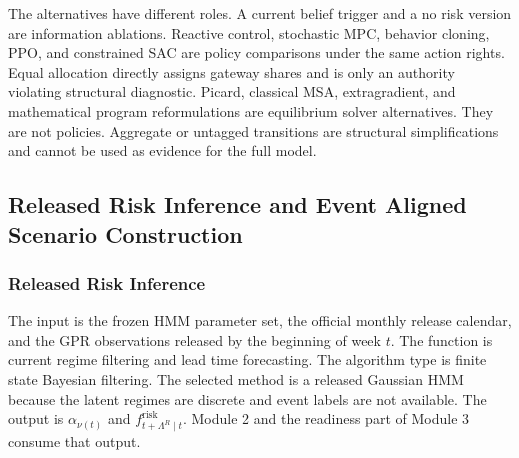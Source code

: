 \documentclass[a4paper,fleqn]{cas-sc}
\begin{document}
The alternatives have different roles. A current belief trigger and a no risk
version are information ablations. Reactive control, stochastic MPC, behavior
cloning, PPO, and constrained SAC are policy comparisons under the same action
rights. Equal allocation directly assigns gateway shares and is only an
authority violating structural diagnostic. Picard, classical MSA,
extragradient, and mathematical program reformulations are equilibrium solver
alternatives. They are not policies. Aggregate or untagged transitions are
structural simplifications and cannot be used as evidence for the full model.

\subsection{Released Risk Inference and Event Aligned Scenario Construction}
\label{subsec:filter-projection}

\subsubsection{Released Risk Inference}
The input is the frozen HMM parameter set, the official monthly release
calendar, and the GPR observations released by the beginning of week $t$. The
function is current regime filtering and lead time forecasting. The algorithm
type is finite state Bayesian filtering. The selected method is a released
Gaussian HMM because the latent regimes are discrete and event labels are not
available. The output is $\alpha_{\nu(t)}$ and
$f^{\mathrm{risk}}_{t+\Lambda^R\mid t}$. Module 2 and the readiness part of
Module 3 consume that output.
\end{document}
